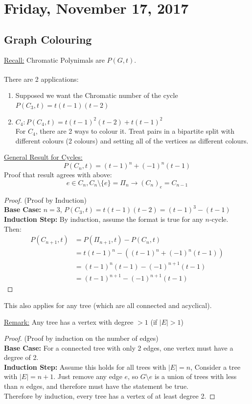 \documentclass[12pt]{article}
\begin{document}
\newpage

\section{Friday, November 17, 2017}

\subsection{Graph Colouring}

\underline{Recall:} Chromatic Polynimals are $P(G,t)$.\\
\\
There are 2 applications:
\begin{enumerate}
	\item{Supposed we want the Chromatic number of the cycle $P(C_3, t) = t(t-1)(t-2)$}
	\item{
	$C_4 : P(C_4, t) = t(t-1)^2 (t-2) + t(t-1)^2$\\
	For $C_4$, there are 2 ways to colour it. Treat pairs in a bipartite split with different colours (2 colours) and setting all of the vertices as different colours.
	}
\end{enumerate}

\underline{General Result for Cycles:} $$P(C_n, t) = (t-1)^n + (-1)^n (t-1)$$
Proof that result agrees with above:\\
$$e \in C_n, C_n \setminus \{ e \} = \Pi_n \rightarrow (C_n)_e = C_{n-1}$$
\begin{proof}
	(Proof by Induction)\\
	\textbf{Base Case:} $n=3$, $P(C_3, t) = t(t-1)(t-2) = (t-1)^3 - (t-1)$
	\textbf{Induction Step:} By induction, assume the format is true for any $n$-cycle.\\
	Then:
	\begin{align*}
		P(C_{n+1},t) &= P(\Pi_{n+1}, t) - P(C_n, t)\\
		&= t(t-1)^n - ((t-1)^n + (-1)^n (t-1))\\
		&= (t-1)^n (t-1) - (-1)^{n+1} (t-1)\\
		&= (t-1)^{n+1} - (-1)^{n+1} (t-1)
	\end{align*}
\end{proof}

This also applies for any tree (which are all connected and acyclical).

\begin{tcolorbox}
	\underline{Remark:} Any tree has a vertex with degree $> 1$ (if $|E| > 1$)
\end{tcolorbox}
\begin{proof}
	(Proof by induction on the number of edges)\\
	\textbf{Base Case:} For a connected tree with only 2 edges, one vertex must have a degree of 2.\\
	\textbf{Induction Step:} Assume this holds for all trees with $|E|=n$, Consider a tree with $|E|=n+1$. Just remove any edge $e$, so $G\setminus e$ is a union of trees with less than $n$ edges, and therefore must have the statement be true.\\
	Therefore by induction, every tree has a vertex of at least degree 2.
\end{proof}
\end{document}
